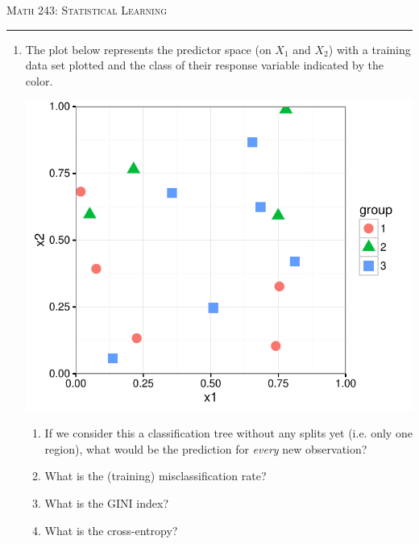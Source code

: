 \documentclass{article}\usepackage[]{graphicx}\usepackage[]{color}
\begin{document}
\begin{center}
\textsc{Math 243: Statistical Learning} \\
\noindent\rule{12cm}{0.4pt}
\end{center}


\begin{enumerate}
\setlength\itemsep{4em}

\item The plot below represents the predictor space (on $X_1$ and $X_2$) with a training data set plotted and the class of their response variable indicated by the color.

\begin{minipage}{.5\linewidth}
{\includegraphics[scale=0.6]{3-class-plot}}
\end{minipage}
\begin{minipage}{.5\linewidth}

\begin{enumerate}
\setlength\itemsep{3em}
\item If we consider this a classification tree without any splits yet (i.e. only one region), what would be the prediction for \emph{every} new observation?
\item What is the (training) misclassification rate?
\item What is the GINI index?
\item What is the cross-entropy?
\end{enumerate}

\end{minipage}


\end{enumerate}
\end{document}
